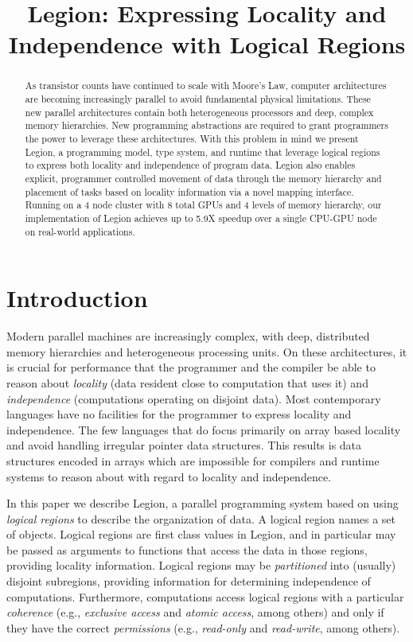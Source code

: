 \documentclass[9pt,nocopyrightspace]{sigplanconf}
\begin{document}
\title{Legion: Expressing Locality and Independence with Logical Regions}
\authorinfo{}{}{}
\maketitle

\begin{abstract}
As transistor counts have continued to scale with Moore's Law, computer
architectures are becoming increasingly parallel to avoid fundamental
physical limitations.  These new parallel architectures contain both
heterogeneous processors and deep, complex memory hierarchies.  New
programming abstractions are required to grant programmers the power
to leverage these architectures.  With this problem in mind we present Legion, 
a programming model, type system, and runtime that leverage 
logical regions to express both locality and independence of program data.  
Legion also enables explicit, programmer controlled movement of data through
the memory hierarchy and placement of tasks based on locality information
via a novel mapping interface.  Running on a 4 node cluster with 8 total GPUs 
and 4 levels of memory hierarchy, our implementation of Legion 
achieves up to 5.9X speedup over a single CPU-GPU node on real-world applications.
\end{abstract}

\section{Introduction}
\label{sect:intro}
Modern parallel machines are increasingly complex, with deep,
distributed memory hierarchies and heterogeneous processing units.  On
these architectures, it is crucial for performance that the programmer
and the compiler be able to reason about {\em locality} (data resident
close to computation that uses it) and {\em independence} (computations
operating on disjoint data).  Most contemporary
languages have no facilities for the programmer to express locality
and independence.  The few languages that do focus primarily on
array based locality \cite{Fatahalian06,CHAPEL04,UPC99} and 
avoid handling irregular pointer data structures.  This results is
data structures encoded in arrays which are impossible for compilers
and runtime systems to reason about with regard to locality and independence.

In this paper we describe Legion, a parallel programming system based
on using {\em logical regions} to describe the organization of data.
A logical region names a set of objects.  Logical regions are first
class values in Legion, and in particular may be passed as arguments
to functions that access the data in those regions, providing locality
information.  Logical regions may be {\em partitioned} into (usually)
disjoint subregions, providing information for determining independence of computations.  Furthermore,
computations access logical regions with a particular {\em coherence}
(e.g., {\em exclusive access} and {\em atomic access}, among others)
and only if they have the correct {\em permissions} (e.g., {\em
  read-only} and {\em read-write}, among others).
\end{document}
